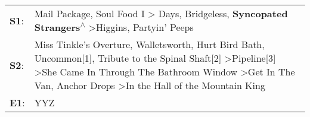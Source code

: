 \begin{supertabular}{p{0.03\textwidth}p{0.92\textwidth}}
 \textbf{S1}:  &                                                                                                                                                                                                                    Mail Package\textsuperscript{}, \enspace Soul Food I\textsuperscript{} \textgreater {} Days\textsuperscript{}, \enspace Bridgeless\textsuperscript{}, \enspace \textbf{Syncopated Strangers\textsuperscript{$\wedge$}} \textgreater \enspace Higgins\textsuperscript{}, \enspace Partyin' Peeps\textsuperscript{}  \enspace  \\
 \textbf{S2}:  &  Miss Tinkle's Overture\textsuperscript{}, \enspace Walletsworth\textsuperscript{}, \enspace Hurt Bird Bath\textsuperscript{}, \enspace Uncommon[1]\textsuperscript{}, \enspace Tribute to the Spinal Shaft[2]\textsuperscript{} \textgreater \enspace Pipeline[3]\textsuperscript{} \textgreater \enspace She Came In Through The Bathroom Window\textsuperscript{} \textgreater \enspace Get In The Van\textsuperscript{}, \enspace Anchor Drops\textsuperscript{} \textgreater \enspace In the Hall of the Mountain King\textsuperscript{}  \enspace  \\
 \textbf{E1}:  &                                                                                                                                                                                                                                                                                                                                                                                                                                                                                                                         YYZ\textsuperscript{}  \enspace  \\
\end{supertabular}
